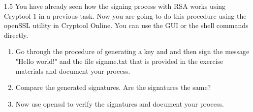 \documentclass[]{scrartcl}
\newcounter{exercise}
\newcounter{qid}[section]
\newcommand{\exerciseprefix}{prefix}
\newcommand{\questiontitle}{Questions}
\newcommand{\blockid}{B4}
\newcommand{\exname}{}
\begin{document}
\renewcommand{\exerciseprefix}{PS-\blockid{}-E\theexercise: \exname{}-Q\theqid}
\renewcommand{\questiontitle}{\exerciseprefix{}: openSSL message signing}
\begin{exercisebox}{1.5}
You have already seen how the signing process with RSA works using Cryptool 1 in a previous task. Now you are going to do this procedure using the openSSL utility in Cryptool Online. You can use the GUI or the shell commands directly.

\begin{enumerate}
    \item Go through the procedure of generating a key and and then sign the message "Hello world!" and the file signme.txt that is provided in the exercise materials and document your process.
    \item Compare the generated signatures. Are the signatures the same?
    \item Now use openssl to verify the signatures and document your process.
\end{enumerate}
\end{exercisebox}
\end{document}
